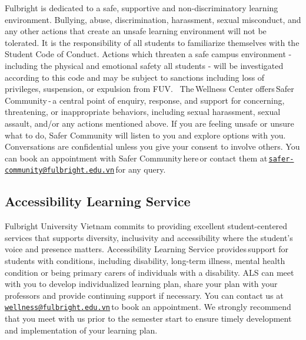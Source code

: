 \documentclass[
]{article}
\begin{document}
Fulbright is dedicated to a safe, supportive and non-discriminatory learning environment. Bullying, abuse, discrimination, harassment, sexual misconduct, and any other actions that create an unsafe learning environment will not be tolerated. It is the responsibility of all students to familiarize themselves with the\,Student Code of Conduct. Actions which threaten a safe campus environment - including the physical and emotional safety all students - will be investigated according to this code and may be subject to sanctions including loss of privileges, suspension, or expulsion from FUV.
\,
The\,Wellness Center offers\,Safer Community\,-\,a central point of enquiry, response, and support for concerning, threatening, or inappropriate behaviors, including sexual harassment, sexual assault, and/or any actions mentioned above. If you are feeling unsafe or unsure what to do, Safer Community will listen to you and explore options with you. Conversations are confidential unless you give your consent to involve others. You can book an appointment with Safer Community\,here\,or contact them at\,\href{mailto:safer-community@fulbright.edu.vn}{\nolinkurl{safer-community@fulbright.edu.vn}}\,for any query.

\hypertarget{accessibility-learning-service}{%
\subsection*{Accessibility Learning Service}\label{accessibility-learning-service}}

Fulbright University Vietnam commits to providing excellent student-centered services that supports diversity, inclusivity and accessibility where the student's voice and presence matters. Accessibility Learning Service provides\,support for students with conditions, including disability, long-term illness, mental health condition or being primary carers of individuals with a disability. ALS can meet with you to develop individualized learning plan, share your plan with your professors and provide continuing support if necessary. You can contact us at\,\href{mailto:wellness@fulbright.edu.vn}{\nolinkurl{wellness@fulbright.edu.vn}}\,to book an appointment. We strongly recommend that you meet with us prior to the semester start to ensure timely development and implementation of your learning plan.
\end{document}
